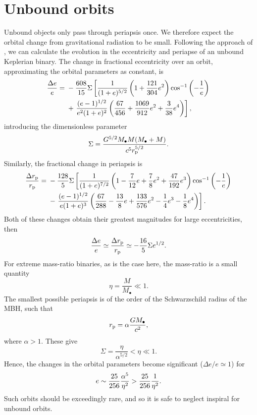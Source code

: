 \section{Unbound orbits}\label{ap:Unbound}

Unbound objects only pass through periapsis once. We therefore expect the orbital change from gravitational radiation to be small. Following the approach of \citet{Turner1977}, we can calculate the evolution in the eccentricity and periapse of an unbound Keplerian binary. The change in fractional eccentricity over an orbit, approximating the orbital parameters as constant, is
\begin{align}
\dfrac{\Delta e}{e} = {} & -\dfrac{608}{15}\Sigma\left[\dfrac{1}{(1+e)^{5/2}}\left(1 + \dfrac{121}{304}e^2\right)\cos^{-1}\left(-\dfrac{1}{e}\right) \right. \nonumber \\*  {} & + \left. \dfrac{(e - 1)^{1/2}}{e^2(1+e)^2}\left(\dfrac{67}{456} + \dfrac{1069}{912}e^2 + \dfrac{3}{38}e^4\right)\right],
\end{align}
introducing the dimensionless parameter
\begin{equation}
\Sigma = \dfrac{G^{5/2}M_\bullet M(M_\bullet+ M)}{c^5r_\mathrm{p}^{5/2}}.
\end{equation}
Similarly, the fractional change in periapsis is
\begin{align}
\dfrac{\Delta r_\mathrm{p}}{r_\mathrm{p}} = {} & -\dfrac{128}{5}\Sigma\left[\dfrac{1}{(1+e)^{7/2}}\left(1 - \dfrac{7}{12}e + \dfrac{7}{8}e^2 + \dfrac{47}{192}e^3\right)\cos^{-1}\left(-\dfrac{1}{e}\right) \right. \nonumber \\*
 {} & - \left. \dfrac{(e - 1)^{1/2}}{e(1 + e)^3}\left(\dfrac{67}{288} - \dfrac{13}{8}e + \dfrac{133}{576}e^2 - \dfrac{1}{4}e^3 - \dfrac{1}{8}e^4\right)\right].
\end{align}
Both of these changes obtain their greatest magnitudes for large eccentricities, then
\begin{equation}
\dfrac{\Delta e}{e} \simeq \dfrac{\Delta r_\mathrm{p}}{r_\mathrm{p}} \simeq -\dfrac{16}{5}\Sigma e^{1/2}.
\end{equation}
For extreme mass-ratio binaries, as is the case here, the mass-ratio is a small quantity
\begin{equation}
\eta = \dfrac{M}{M_\bullet} \ll 1.
\end{equation}
The smallest possible periapsis is of the order of the Schwarzschild radius of the MBH, such that 
\begin{equation}
r_\mathrm{p} = \alpha\dfrac{GM_\bullet}{c^2},
\end{equation}
where $\alpha > 1$. These give
\begin{equation}
\Sigma = \dfrac{\eta}{\alpha^{5/2}} < \eta \ll 1.
\end{equation}
Hence, the changes in the orbital parameters become significant ($\Delta e / e \simeq 1$) for
\begin{equation}
e \sim \dfrac{25}{256}\dfrac{\alpha^5}{\eta^2} > \dfrac{25}{256}\dfrac{1}{\eta^2}.
\end{equation}
Such orbits should be exceedingly rare, and so it is safe to neglect inspiral for unbound orbits.
